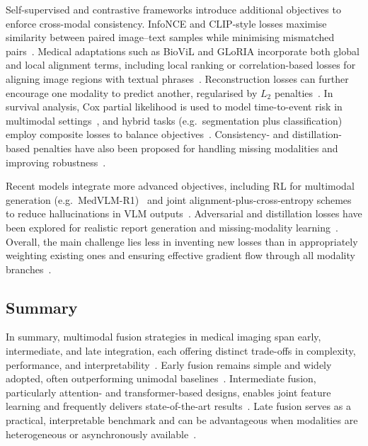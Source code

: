 \documentclass[final,british,a4paper,12pt]{phdthesis}
\begin{document}
Self-supervised and contrastive frameworks introduce additional objectives to enforce cross-modal consistency. InfoNCE and CLIP-style losses maximise similarity between paired image–text samples while minimising mismatched pairs~\cite{windsor2023vision,ryu2025vlmreview}. Medical adaptations such as BioViL and GLoRIA incorporate both global and local alignment terms, including local ranking or correlation-based losses for aligning image regions with textual phrases~\cite{huang2021gloria}. Reconstruction losses can further encourage one modality to predict another, regularised by $L_2$ penalties~\cite{stahlschmidt2022,krones2025review}. In survival analysis, Cox partial likelihood is used to model time-to-event risk in multimodal settings~\cite{huang2020fusion}, and hybrid tasks (e.g.\ segmentation plus classification) employ composite losses to balance objectives~\cite{oltu2025automated,hasan2024recent}. Consistency- and distillation-based penalties have also been proposed for handling missing modalities and improving robustness~\cite{huang2020fusion,fang2024aligning}.

Recent models integrate more advanced objectives, including RL for multimodal generation (e.g.\ MedVLM-R1)~\cite{pan2025medvlm} and joint alignment-plus-cross-entropy schemes to reduce hallucinations in VLM outputs~\cite{ryu2025vlmreview}. Adversarial and distillation losses have been explored for realistic report generation and missing-modality learning~\cite{fang2024aligning}. Overall, the main challenge lies less in inventing new losses than in appropriately weighting existing ones and ensuring effective gradient flow through all modality branches~\cite{mohsen2022artificial}.

\subsection{Summary} \label{sec:conclusion-lit}

In summary, multimodal fusion strategies in medical imaging span early, intermediate, and late integration, each offering distinct trade-offs in complexity, performance, and interpretability~\cite{mohsen2022artificial,kline2022multimodal}. Early fusion remains simple and widely adopted, often outperforming unimodal baselines~\cite{mohsen2022artificial,kline2022multimodal}. Intermediate fusion, particularly attention- and transformer-based designs, enables joint feature learning and frequently delivers state-of-the-art results~\cite{mohsen2022artificial,zhou2023transformer,simon2025multimodal}. Late fusion serves as a practical, interpretable benchmark and can be advantageous when modalities are heterogeneous or asynchronously available~\cite{mohsen2022artificial,huang2020multimodal,lu2024deep}.
\end{document}
